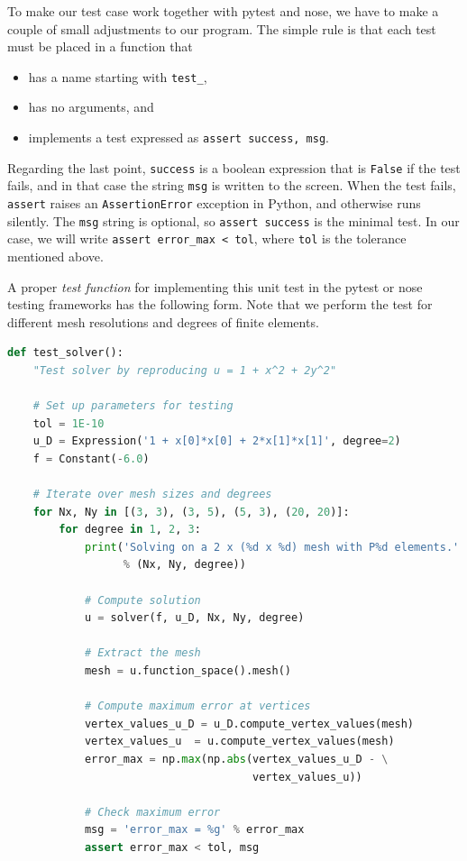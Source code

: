 \documentclass[graybox,envcountchap,sectrefs,final]{svmonodo}
\begin{document}
To make our test case work together with pytest and nose, we have to
make a couple of small adjustments to our program. The simple
rule is that each test must be placed in a function that

\begin{itemize}
 \item has a name starting with \Verb!test_!,

 \item has no arguments, and

 \item implements a test expressed as \texttt{assert success, msg}.
\end{itemize}

\noindent
Regarding the last point, \texttt{success} is a boolean expression that is
\texttt{False} if the test fails, and in that case the string \texttt{msg} is
written to the screen. When the test fails, \texttt{assert} raises an
\texttt{AssertionError} exception in Python, and otherwise runs
silently. The \texttt{msg} string is optional, so \texttt{assert success} is the
minimal test. In our case, we will write \Verb!assert error_max < tol!,
where \texttt{tol} is the tolerance mentioned above.

A proper \emph{test function} for implementing this unit test in the
pytest or nose testing frameworks has the following form. Note
that we perform the test for different mesh resolutions and degrees of
finite elements.

\begin{lstlisting}[language=Python,style=graycolor]
def test_solver():
    "Test solver by reproducing u = 1 + x^2 + 2y^2"

    # Set up parameters for testing
    tol = 1E-10
    u_D = Expression('1 + x[0]*x[0] + 2*x[1]*x[1]', degree=2)
    f = Constant(-6.0)

    # Iterate over mesh sizes and degrees
    for Nx, Ny in [(3, 3), (3, 5), (5, 3), (20, 20)]:
        for degree in 1, 2, 3:
            print('Solving on a 2 x (%d x %d) mesh with P%d elements.'
                  % (Nx, Ny, degree))

            # Compute solution
            u = solver(f, u_D, Nx, Ny, degree)

            # Extract the mesh
            mesh = u.function_space().mesh()

            # Compute maximum error at vertices
            vertex_values_u_D = u_D.compute_vertex_values(mesh)
            vertex_values_u  = u.compute_vertex_values(mesh)
            error_max = np.max(np.abs(vertex_values_u_D - \
                                      vertex_values_u))

            # Check maximum error
            msg = 'error_max = %g' % error_max
            assert error_max < tol, msg
\end{lstlisting}
\end{document}
